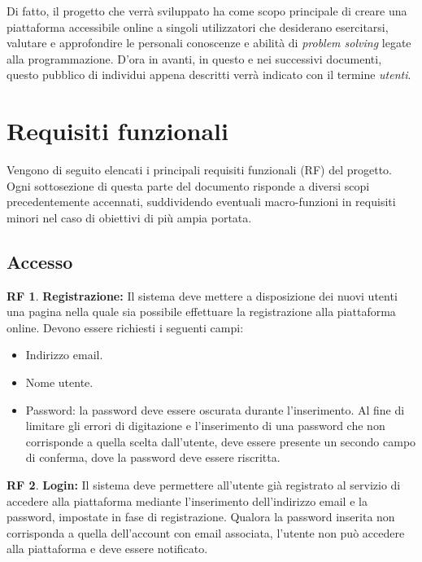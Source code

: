 \documentclass[11pt, a4paper]{article}
\theoremstyle{definition}
\newtheorem{funcreq}{RF} %
\begin{document}
Di fatto, il progetto che verrà sviluppato ha come scopo principale di
creare una piattaforma accessibile online a singoli utilizzatori che
desiderano esercitarsi, valutare e approfondire le personali
conoscenze e abilità di \textit{problem solving} legate alla programmazione.
D'ora in avanti, in questo e nei successivi documenti, questo pubblico di
individui appena descritti verrà indicato con il termine \textit{utenti}.

\newpage
\section{Requisiti funzionali}
Vengono di seguito elencati i principali requisiti funzionali (RF)
del progetto. Ogni sottosezione di questa parte del documento
risponde a diversi scopi precedentemente accennati, suddividendo
eventuali macro-funzioni in requisiti minori nel caso di obiettivi
di più ampia portata.

\subsection{Accesso}

\begin{funcreq}
\textbf{Registrazione:}
Il sistema deve mettere a disposizione dei nuovi utenti una pagina
nella quale sia possibile effettuare la registrazione alla piattaforma
online. Devono essere richiesti i seguenti campi:
\begin{itemize}
    \item Indirizzo email.
    \item Nome utente.
    \item Password: la password deve essere oscurata durante l'inserimento.
    Al fine di limitare gli errori di digitazione e l'inserimento di una
    password che non corrisponde a quella scelta dall'utente, deve essere
    presente un secondo campo di conferma, dove la password deve essere
    riscritta.
\end{itemize}
\end{funcreq}

\begin{funcreq}
\label{login}
\textbf{Login:}
Il sistema deve permettere all'utente già registrato al servizio di
accedere alla piattaforma mediante l'inserimento dell'indirizzo
email e la password, impostate in fase di registrazione. Qualora la
password inserita non corrisponda a quella dell'account con email
associata, l'utente non può accedere alla piattaforma e deve essere
notificato.
\end{funcreq}
\end{document}
